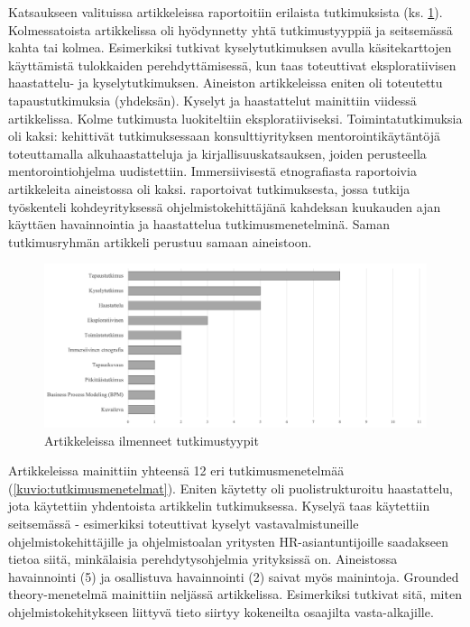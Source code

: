 \documentclass[utf8]{gradu3}
\begin{document}
Katsaukseen valituissa artikkeleissa raportoitiin erilaista tutkimuksista (ks. \ref{kuvio:tutkimustyypit}). Kolmessatoista artikkelissa oli hyödynnetty yhtä tutkimustyyppiä ja seitsemässä kahta tai kolmea. Esimerkiksi \textcite{azanza-ym-2021} tutkivat kyselytutkimuksen avulla käsitekarttojen käyttämistä tulokkaiden perehdyttämisessä, kun taas \textcite{pham-ym-2017} toteuttivat eksploratiivisen haastattelu- ja kyselytutkimuksen. Aineiston artikkeleissa eniten oli toteutettu tapaustutkimuksia (yhdeksän). Kyselyt ja haastattelut mainittiin viidessä artikkelissa. Kolme tutkimusta luokiteltiin eksploratiiviseksi. Toimintatutkimuksia oli kaksi: \textcite{bjornson-dingsøyr-2005} kehittivät tutkimuksessaan konsulttiyrityksen mentorointikäytäntöjä toteuttamalla alkuhaastatteluja ja kirjallisuuskatsauksen, joiden perusteella mentorointiohjelma uudistettiin. Immersiivisestä etnografiasta raportoivia artikkeleita aineistossa oli kaksi. \textcite{kumar-ym-2016} raportoivat tutkimuksesta, jossa tutkija työskenteli kohdeyrityksessä ohjelmistokehittäjänä kahdeksan kuukauden ajan käyttäen havainnointia ja haastattelua tutkimusmenetelminä. Saman tutkimusryhmän artikkeli \textcite{kumar-wallace-2019} perustuu samaan aineistoon. 

\begin{figure}[h]
    \centering
    \includegraphics[width=\textwidth]{media/tutkimustyypit.png}
    \caption{Artikkeleissa ilmenneet tutkimustyypit}
    \label{kuvio:tutkimustyypit}
\end{figure}

Artikkeleissa mainittiin yhteensä 12 eri tutkimusmenetelmää (\ref{kuvio:tutkimusmenetelmat}). Eniten käytetty oli puolistrukturoitu haastattelu, jota käytettiin yhdentoista artikkelin tutkimuksessa. Kyselyä taas käytettiin seitsemässä - esimerkiksi \textcite{kulkarni-ym-2010} toteuttivat kyselyt vastavalmistuneille ohjelmistokehittäjille ja ohjelmistoalan yritysten HR-asiantuntijoille saadakseen tietoa siitä, minkälaisia perehdytysohjelmia yrityksissä on. Aineistossa havainnointi (5) ja osallistuva havainnointi (2) saivat myös mainintoja. Grounded theory-menetelmä mainittiin neljässä artikkelissa. Esimerkiksi \textcite{viana-ym-2014} tutkivat sitä, miten ohjelmistokehitykseen liittyvä tieto siirtyy kokeneilta osaajilta vasta-alkajille. 
\end{document}
